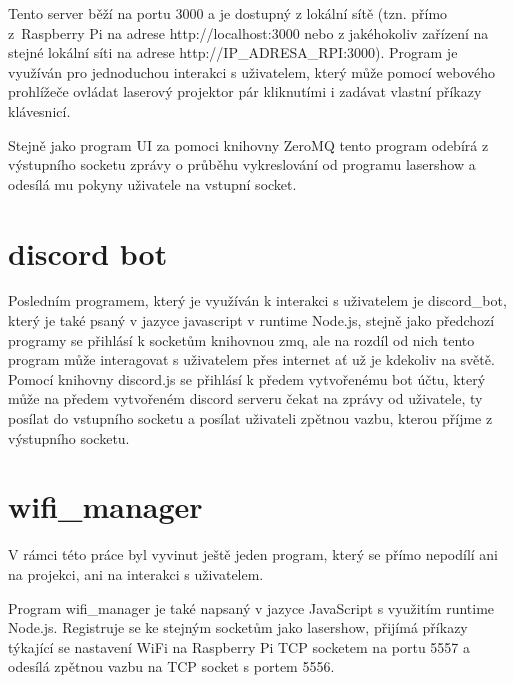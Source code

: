 Tento server běží na portu 3000 a je dostupný z lokální sítě (tzn. přímo z\ Raspberry Pi na adrese http://localhost:3000 nebo z jakéhokoliv zařízení na stejné lokální síti na adrese http://IP\_ADRESA\_RPI:3000).
Program je využíván pro jednoduchou interakci s uživatelem, který může pomocí webového prohlížeče ovládat laserový projektor pár kliknutími i zadávat vlastní příkazy klávesnicí.



Stejně jako program UI za pomoci knihovny ZeroMQ tento program odebírá z výstupního socketu zprávy o průběhu vykreslování od programu lasershow a odesílá mu pokyny uživatele na vstupní socket.



\section{discord bot}

Posledním programem, který je využíván k interakci s uživatelem je discord\_bot, který je také psaný v jazyce javascript v runtime Node.js, stejně jako předchozí programy se přihlásí k socketům knihovnou zmq, ale na rozdíl od nich tento program může interagovat s uživatelem přes internet ať už je kdekoliv na světě.
Pomocí knihovny discord.js se přihlásí k předem vytvořenému bot účtu, který může na předem vytvořeném discord serveru čekat na zprávy od uživatele, ty posílat do vstupního socketu a posílat uživateli zpětnou vazbu, kterou příjme z výstupního socketu.

\section{wifi\_manager}

V rámci této práce byl vyvinut ještě jeden program, který se přímo nepodílí ani na projekci, ani na interakci s uživatelem.

Program wifi\_manager je také napsaný v jazyce JavaScript s využitím runtime Node.js. Registruje se ke stejným socketům jako lasershow, přijímá příkazy týkající se nastavení WiFi na Raspberry Pi TCP socketem na portu 5557 a odesílá zpětnou vazbu na TCP socket s portem 5556.


